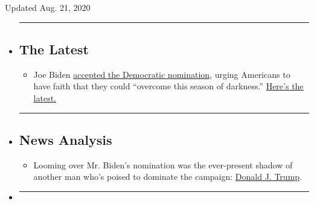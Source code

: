 Updated Aug. 21, 2020

\begin{itemize}
\item
  \begin{center}\rule{0.5\linewidth}{\linethickness}\end{center}

  \hypertarget{the-latest}{%
  \subsection{The Latest}\label{the-latest}}

  \begin{itemize}
  \tightlist
  \item
    Joe Biden
    \href{https://www.nytimes3xbfgragh.onion/live/2020/08/21/us/dnc-convention-election?action=click\&pgtype=Article\&state=default\&region=BELOW_MAIN_CONTENT\&context=storylines_guide}{accepted
    the Democratic nomination}, urging Americans to have faith that they
    could ``overcome this season of darkness.''
    \href{https://www.nytimes3xbfgragh.onion/live/2020/08/21/us/dnc-convention-election?action=click\&pgtype=Article\&state=default\&region=BELOW_MAIN_CONTENT\&context=storylines_guide}{Here's
    the latest.}
  \end{itemize}
\item
  \begin{center}\rule{0.5\linewidth}{\linethickness}\end{center}

  \hypertarget{news-analysis}{%
  \subsection{News Analysis}\label{news-analysis}}

  \begin{itemize}
  \tightlist
  \item
    Looming over Mr. Biden's nomination was the ever-present shadow of
    another man who's poised to dominate the campaign:
    \href{https://www.nytimes3xbfgragh.onion/2020/08/20/us/politics/biden-dnc-speech-trump.html?action=click\&pgtype=Article\&state=default\&region=BELOW_MAIN_CONTENT\&context=storylines_guide}{Donald
    J. Trump}.
  \end{itemize}
\item
  \begin{center}\rule{0.5\linewidth}{\linethickness}\end{center}


\end{itemize}
